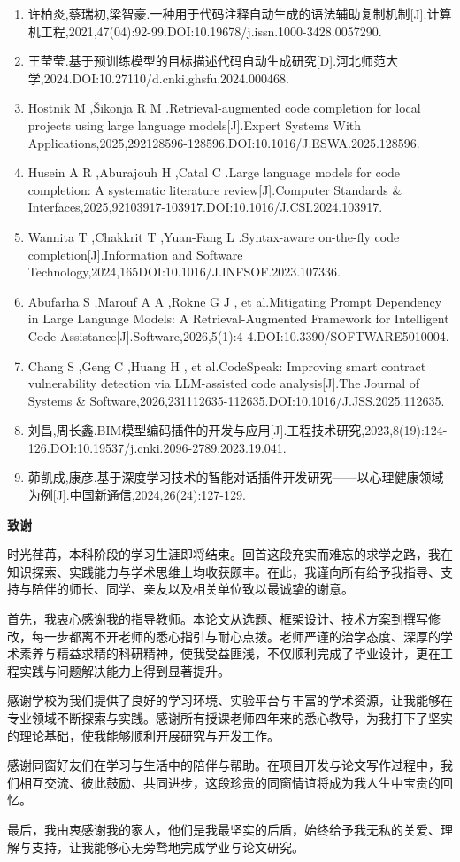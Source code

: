 \begin{enumerate}
\item
  许柏炎,蔡瑞初,梁智豪.一种用于代码注释自动生成的语法辅助复制机制{[}J{]}.计算机工程,2021,47(04):92-99.DOI:10.19678/j.issn.1000-3428.0057290.
\item
  王莹莹.基于预训练模型的目标描述代码自动生成研究{[}D{]}.河北师范大学,2024.DOI:10.27110/d.cnki.ghsfu.2024.000468.
\item
  Hostnik M ,Šikonja R M .Retrieval-augmented code completion for local
  projects using large language models{[}J{]}.Expert Systems With
  Applications,2025,292128596-128596.DOI:10.1016/J.ESWA.2025.128596.
\item
  Husein A R ,Aburajouh H ,Catal C .Large language models for code
  completion: A systematic literature review{[}J{]}.Computer Standards
  \& Interfaces,2025,92103917-103917.DOI:10.1016/J.CSI.2024.103917.
\item
  Wannita T ,Chakkrit T ,Yuan-Fang L .Syntax-aware on-the-fly code
  completion{[}J{]}.Information and Software
  Technology,2024,165DOI:10.1016/J.INFSOF.2023.107336.
\item
  Abufarha S ,Marouf A A ,Rokne G J , et al.Mitigating Prompt Dependency
  in Large Language Models: A Retrieval-Augmented Framework for
  Intelligent Code
  Assistance{[}J{]}.Software,2026,5(1):4-4.DOI:10.3390/SOFTWARE5010004.
\item
  Chang S ,Geng C ,Huang H , et al.CodeSpeak: Improving smart contract
  vulnerability detection via LLM-assisted code analysis{[}J{]}.The
  Journal of Systems \&
  Software,2026,231112635-112635.DOI:10.1016/J.JSS.2025.112635.
\item
  刘昌,周长鑫.BIM模型编码插件的开发与应用{[}J{]}.工程技术研究,2023,8(19):124-126.DOI:10.19537/j.cnki.2096-2789.2023.19.041.
\item
  茆凯成,康彦.基于深度学习技术的智能对话插件开发研究------以心理健康领域为例{[}J{]}.中国新通信,2024,26(24):127-129.
\end{enumerate}

\textbf{致谢}

时光荏苒，本科阶段的学习生涯即将结束。回首这段充实而难忘的求学之路，我在知识探索、实践能力与学术思维上均收获颇丰。在此，我谨向所有给予我指导、支持与陪伴的师长、同学、亲友以及相关单位致以最诚挚的谢意。

首先，我衷心感谢我的指导教师。本论文从选题、框架设计、技术方案到撰写修改，每一步都离不开老师的悉心指引与耐心点拨。老师严谨的治学态度、深厚的学术素养与精益求精的科研精神，使我受益匪浅，不仅顺利完成了毕业设计，更在工程实践与问题解决能力上得到显著提升。

感谢学校为我们提供了良好的学习环境、实验平台与丰富的学术资源，让我能够在专业领域不断探索与实践。感谢所有授课老师四年来的悉心教导，为我打下了坚实的理论基础，使我能够顺利开展研究与开发工作。

感谢同窗好友们在学习与生活中的陪伴与帮助。在项目开发与论文写作过程中，我们相互交流、彼此鼓励、共同进步，这段珍贵的同窗情谊将成为我人生中宝贵的回忆。

最后，我由衷感谢我的家人，他们是我最坚实的后盾，始终给予我无私的关爱、理解与支持，让我能够心无旁骛地完成学业与论文研究。

